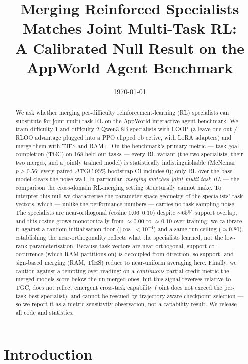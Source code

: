 \documentclass[11pt]{article}
\title{\bf Merging Reinforced Specialists Matches Joint Multi-Task RL:\\
A Calibrated Null Result on the AppWorld Agent Benchmark}
\author{\TODO{authors}}
\affil{\TODO{affiliation}}
\date{\today}
\begin{document}
\maketitle

\begin{abstract}
We ask whether merging per-difficulty reinforcement-learning (RL) specialists can
substitute for joint multi-task RL on the AppWorld interactive-agent benchmark.
We train difficulty-1 and difficulty-2 Qwen3-8B specialists with LOOP
(a leave-one-out / RLOO advantage plugged into a PPO clipped objective, with LoRA
adapters) and merge them with TIES and RAM+. On the benchmark's primary metric ---
task-goal completion (TGC) on 168 held-out tasks --- every RL variant (the two
specialists, their two merges, and a jointly trained model) is statistically
indistinguishable (McNemar $p\ge0.56$; every paired $\Delta$TGC 95\% bootstrap CI
includes $0$); only RL over the base model clears the noise wall. In particular,
\emph{merging matches joint multi-task RL} --- the comparison the cross-domain
RL-merging setting structurally cannot make. To interpret this null we characterise the
parameter-space geometry of the specialists' task vectors, which --- unlike the
performance numbers --- carries no task-sampling noise. The specialists are
near-orthogonal (cosine $0.06$--$0.10$) despite $\sim\!65\%$ support overlap, and this
cosine grows monotonically from $\approx0.00$ to $\approx0.10$ over training; we
calibrate it against a random-initialisation floor ($|\cos|<10^{-4}$) and a same-run
ceiling ($\approx0.80$), establishing the near-orthogonality reflects what the
specialists learned, not the low-rank parameterisation. Because task vectors are
near-orthogonal, support co-occurrence (which RAM partitions on) is decoupled from
direction, so support- and sign-based merging (RAM, TIES) reduce to near-uniform
averaging here. Finally, we caution against a tempting over-reading: on a
\emph{continuous} partial-credit metric the merged models score below the un-merged
ones, but this signal reverses relative to TGC, does not reflect emergent cross-task
capability (joint does not exceed the per-task best specialist), and cannot be rescued
by trajectory-aware checkpoint selection --- so we report it as a metric-sensitivity
observation, not a capability result. We release all code and statistics.
\end{abstract}

\section{Introduction}
\label{sec:intro}
\end{document}
